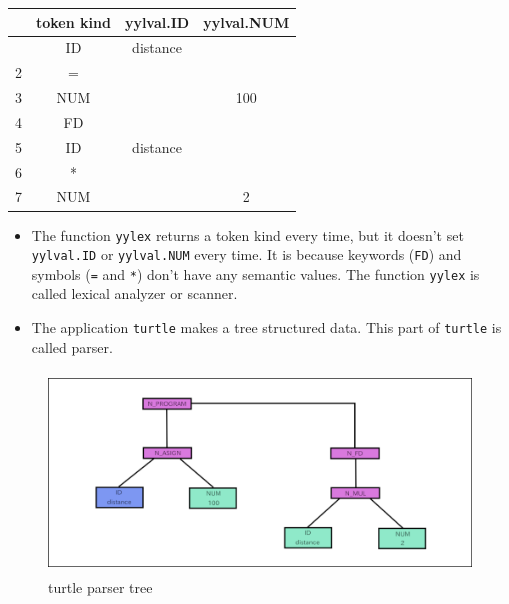 \begin{longtable}[]{@{}cccc@{}}
\toprule\noalign{}
& token kind & yylval.ID & yylval.NUM \\
\midrule\noalign{}
\endhead
\bottomrule\noalign{}
\endlastfoot
1 & ID & distance & \\
2 & = & & \\
3 & NUM & & 100 \\
4 & FD & & \\
5 & ID & distance & \\
6 & * & & \\
7 & NUM & & 2 \\
\end{longtable}

\begin{itemize}
\tightlist
\item
  The function \passthrough{\lstinline!yylex!} returns a token kind
  every time, but it doesn't set \passthrough{\lstinline!yylval.ID!} or
  \passthrough{\lstinline!yylval.NUM!} every time. It is because
  keywords (\passthrough{\lstinline!FD!}) and symbols
  (\passthrough{\lstinline!=!} and \passthrough{\lstinline!*!}) don't
  have any semantic values. The function \passthrough{\lstinline!yylex!}
  is called lexical analyzer or scanner.
\item
  The application \passthrough{\lstinline!turtle!} makes a tree
  structured data. This part of \passthrough{\lstinline!turtle!} is
  called parser.
\end{itemize}

\begin{figure}
\centering
\includegraphics[width=12cm,height=5.34cm]{../image/turtle_parser_tree.png}
\caption{turtle parser tree}
\end{figure}


